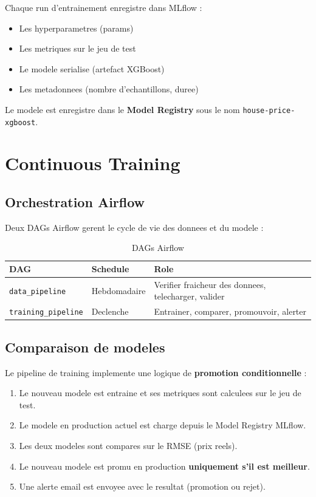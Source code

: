 \documentclass[a4paper,11pt]{article}
\begin{document}
Chaque run d'entrainement enregistre dans MLflow :
\begin{itemize}
    \item Les hyperparametres (params)
    \item Les metriques sur le jeu de test
    \item Le modele serialise (artefact XGBoost)
    \item Les metadonnees (nombre d'echantillons, duree)
\end{itemize}

Le modele est enregistre dans le \textbf{Model Registry} sous le nom
\texttt{house-price-xgboost}.

\section{Continuous Training}

\subsection{Orchestration Airflow}

Deux DAGs Airflow gerent le cycle de vie des donnees et du modele :

\begin{table}[h]
\centering
\begin{tabular}{lll}
\toprule
\textbf{DAG} & \textbf{Schedule} & \textbf{Role} \\
\midrule
\texttt{data\_pipeline} & Hebdomadaire & Verifier fraicheur des donnees, telecharger, valider \\
\texttt{training\_pipeline} & Declenche & Entrainer, comparer, promouvoir, alerter \\
\bottomrule
\end{tabular}
\caption{DAGs Airflow}
\end{table}

\subsection{Comparaison de modeles}

Le pipeline de training implemente une logique de \textbf{promotion conditionnelle} :

\begin{enumerate}
    \item Le nouveau modele est entraine et ses metriques sont calculees sur le jeu de test.
    \item Le modele en production actuel est charge depuis le Model Registry MLflow.
    \item Les deux modeles sont compares sur le RMSE (prix reels).
    \item Le nouveau modele est promu en production \textbf{uniquement s'il est meilleur}.
    \item Une alerte email est envoyee avec le resultat (promotion ou rejet).
\end{enumerate}
\end{document}
